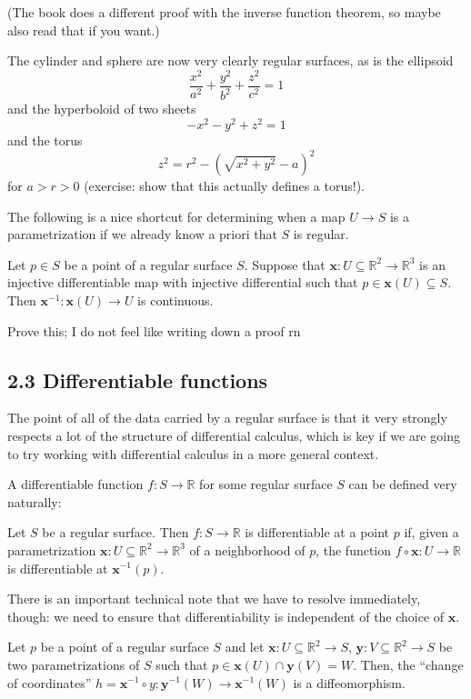 \documentclass[10pt]{scrartcl}
\providecommand{\RR}{\mathbb R}
\providecommand{\inv}{^{-1}}
\providecommand{\mb}[1]{\mathbf{#1}}
\begin{document}
(The book does a different proof with the inverse function theorem,
so maybe also read that if you want.)

\begin{example}
	The cylinder and sphere are now very clearly regular surfaces,
	as is the ellipsoid
	\[\frac{x^2}{a^2} + \frac{y^2}{b^2} + \frac{z^2}{c^2} = 1\]
	and the hyperboloid of two sheets
	\[-x^2-y^2+z^2=1\]
	and the torus
	\[z^2 = r^2 - (\sqrt{x^2+y^2} - a)^2\]
	for $a > r > 0$
	(exercise: show that this actually defines a torus!).
\end{example}

The following is a nice shortcut for determining when a map $U\to S$
is a parametrization if we already know a priori that $S$ is regular.
\begin{prop}
	Let $p\in S$ be a point of a regular surface $S$.
	Suppose that $\mb x\colon U\subseteq\RR^2\to\RR^3$
	is an injective differentiable map with injective differential
	such that $p\in\mb x(U)\subseteq S$.
	Then $\mb x\inv\colon \mb x(U)\to U$ is continuous.
\end{prop}

\begin{exercise}
	Prove this; I do not feel like writing down a proof rn
\end{exercise}

\subsection{2.3 Differentiable functions}
The point of all of the data carried by a regular surface
is that it very strongly respects a lot of the structure
of differential calculus, which is key if we are going to
try working with differential calculus in a more general context.

A differentiable function $f\colon S\to\RR$
for some regular surface $S$ can be defined very naturally:
\begin{definition}
	Let $S$ be a regular surface. Then $f\colon S\to\RR$ is differentiable
	at a point $p$ if, given a parametrization
	$\mb x\colon U\subseteq\RR^2\to\RR^3$ of a neighborhood of $p$,
	the function $f\circ\mb x\colon U\to\RR$ is differentiable
	at $\mb x\inv(p)$.
\end{definition}

There is an important technical note that we have to
resolve immediately, though: we need to ensure that
differentiability is independent of the choice of $\mb x$.

\begin{prop}
	Let $p$ be a point of a regular surface $S$ and let
	$\mb x\colon U\subseteq\RR^2\to S$,
	$\mb y\colon V\subseteq\RR^2\to S$
	be two parametrizations of $S$ such that $p\in\mb x(U)\cap\mb y(V)=W$.
	Then, the ``change of coordinates''
	$h = \mb x\inv\circ y\colon \mb y\inv(W)\to\mb x\inv(W)$
	is a diffeomorphism.
\end{prop}
\end{document}
